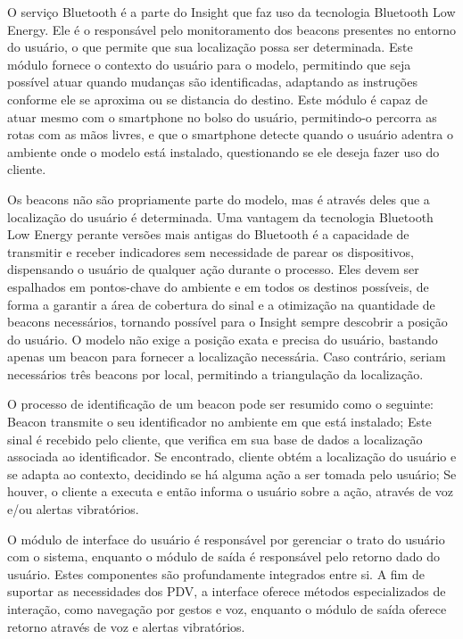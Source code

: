 \documentclass[twoside,english,brazilian]{UNISINOSartigo}
\begin{document}
O serviço Bluetooth é a parte do Insight que faz uso da tecnologia Bluetooth Low Energy. Ele é o responsável pelo monitoramento dos beacons presentes no entorno do usuário, o que permite que sua localização possa ser determinada. Este módulo fornece o contexto do usuário para o modelo, permitindo que seja possível atuar quando mudanças são identificadas, adaptando as instruções conforme ele se aproxima ou se distancia do destino. Este módulo é capaz de atuar mesmo com o smartphone no bolso do usuário, permitindo-o percorra as rotas com as mãos livres, e que o smartphone detecte quando o usuário adentra o ambiente onde o modelo está instalado, questionando se ele deseja fazer uso do cliente.

Os beacons não são propriamente parte do modelo, mas é através deles que a localização do usuário é determinada. Uma vantagem da tecnologia Bluetooth Low Energy perante versões mais antigas do Bluetooth é a capacidade de transmitir e receber indicadores sem necessidade de parear os dispositivos, dispensando o usuário de qualquer ação durante o processo. Eles devem ser espalhados em pontos-chave do ambiente e em todos os destinos possíveis, de forma a garantir a área de cobertura do sinal e a otimização na quantidade de beacons necessários, tornando possível para o Insight sempre descobrir a posição do usuário. O modelo não exige a posição exata e precisa do usuário, bastando apenas um beacon para fornecer a localização necessária. Caso contrário, seriam necessários três beacons por local, permitindo a triangulação da localização.

O processo de identificação de um beacon pode ser resumido como o seguinte: Beacon transmite o seu identificador no ambiente em que está instalado; Este sinal é recebido pelo cliente, que verifica em sua base de dados a localização associada ao identificador. Se encontrado, cliente obtém a localização do usuário e se adapta ao contexto, decidindo se há alguma ação a ser tomada pelo usuário; Se houver, o cliente a executa e então informa o usuário sobre a ação, através de voz e/ou alertas vibratórios.

O módulo de interface do usuário é responsável por gerenciar o trato do usuário com o sistema, enquanto o módulo de saída é responsável pelo retorno dado do usuário. Estes componentes são profundamente integrados entre si. A fim de suportar as necessidades dos PDV, a interface oferece métodos especializados de interação, como navegação por gestos e voz, enquanto o módulo de saída oferece retorno através de voz e alertas vibratórios.
\end{document}
